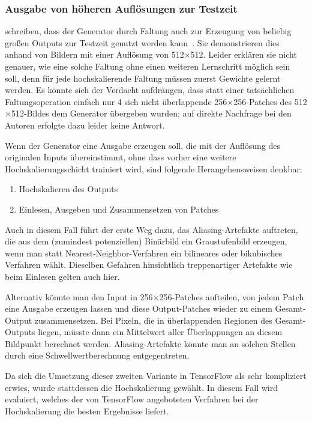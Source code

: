 \subsubsection{Ausgabe von höheren Auflösungen zur Testzeit}

\citeauthor{Isola.2017} schreiben, dass der Generator durch Faltung auch zur Erzeugung von beliebig großen Outputs zur Testzeit genutzt werden kann~\cite{Isola.2017}.
Sie demonstrieren dies anhand von Bildern mit einer Auflösung von 512$\times$512.
Leider erklären sie nicht genauer, wie eine solche Faltung ohne einen weiteren Lernschritt möglich sein soll, denn für jede hochskalierende Faltung müssen zuerst Gewichte gelernt werden.
Es könnte sich der Verdacht aufdrängen, dass statt einer tatsächlichen Faltungsoperation einfach nur 4 sich nicht überlappende 256$\times$256-Patches des 512$\times$512-Bildes dem Generator übergeben wurden; auf direkte Nachfrage bei den Autoren erfolgte dazu leider keine Antwort.

Wenn der Generator eine Ausgabe erzeugen soll, die mit der Auflösung des originalen Inputs übereinstimmt, ohne dass vorher eine weitere Hochskalierungsschicht trainiert wird, sind folgende Herangehensweisen denkbar:

\begin{enumerate}
	\item Hochskalieren des Outputs
	\item Einlesen, Ausgeben und Zusammensetzen von Patches
\end{enumerate}

Auch in diesem Fall führt der erste Weg dazu, das Aliasing-Artefakte auftreten, die aus dem (zumindest potenziellen) Binärbild ein Graustufenbild erzeugen, wenn man statt Nearest-Neighbor-Verfahren ein bilineares oder bikubisches Verfahren wählt.
Dieselben Gefahren hinsichtlich treppenartiger Artefakte wie beim Einlesen gelten auch hier.

Alternativ könnte man den Input in 256$\times$256-Patches aufteilen, von jedem Patch eine Ausgabe erzeugen lassen und diese Output-Patches wieder zu einem Gesamt-Output zusammensetzen.
Bei Pixeln, die in überlappenden Regionen des Gesamt-Outputs liegen, müsste dann ein Mittelwert aller Überlappungen an diesem Bildpunkt berechnet werden.
Aliasing-Artefakte könnte man an solchen Stellen durch eine Schwellwertberechnung entgegentreten.

Da sich die Umsetzung dieser zweiten Variante in TensorFlow als sehr kompliziert erwies, wurde stattdessen die Hochskalierung gewählt.
In diesem Fall wird evaluiert, welches der von TensorFlow angeboteten Verfahren bei der Hochskalierung die besten Ergebnisse liefert.

